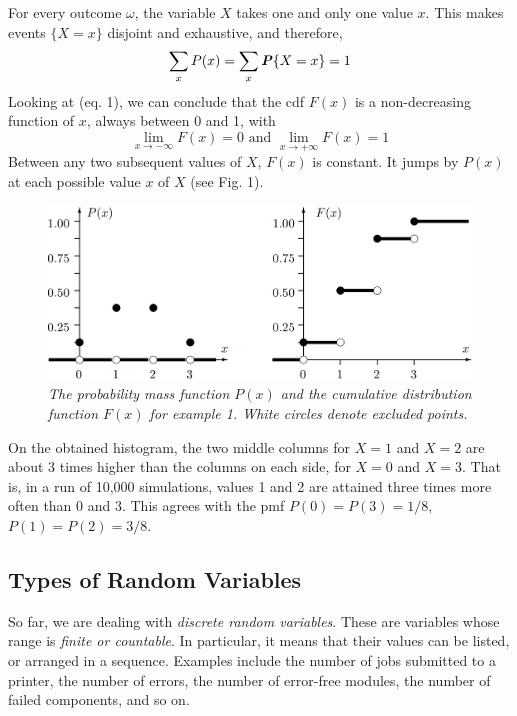 \documentclass{article}
\newcommand{\prob}[1]{\textbf{\textit{P}}\{#1\}}
\begin{document}
For every outcome $\omega$, the variable $X$ takes one and only one value $x$. This makes events $\{X = x\}$ disjoint and exhaustive, and therefore,
\begin{equation*}
    \sum_x P(x) = \sum_x \prob{X = x} = 1
\end{equation*}
Looking at (eq. 1), we can conclude that the cdf $F(x)$ is a non-decreasing function of $x$, always between 0 and 1, with
\begin{equation*}
    \lim_{x\to -\infty} F(x) = 0 \text{ and } \lim_{x \to +\infty} F(x) = 1
\end{equation*}
Between any two subsequent values of $X$, $F(x)$ is constant. It jumps by $P(x)$ at each possible value $x$ of $X$ (see Fig. 1).
\begin{figure}[t]
    \centering
    \includegraphics[width=.8\textwidth]{img/fig3.1.png}
    \caption{\textit{The probability mass function $P(x)$ and the cumulative distribution function $F(x)$ for example 1. White circles denote excluded points.}}
\end{figure}

On the obtained histogram, the two middle columns for $X = 1$ and $X = 2$ are about 3 times higher than the columns on each side, for $X = 0$ and $X = 3$. That is, in a run of 10,000 simulations, values 1 and 2 are attained three times more often than 0 and 3. This agrees with the pmf $P(0) = P(3) = 1/8$, $P(1) = P(2) = 3/8$.

\subsection{Types of Random Variables}

So far, we are dealing with \textit{discrete random variables}. These are variables whose range is \textit{finite or countable}. In particular, it means that their values can be listed, or arranged in a sequence. Examples include the number of jobs submitted to a printer, the number of errors, the number of error-free modules, the number of failed components, and so on.
\end{document}
